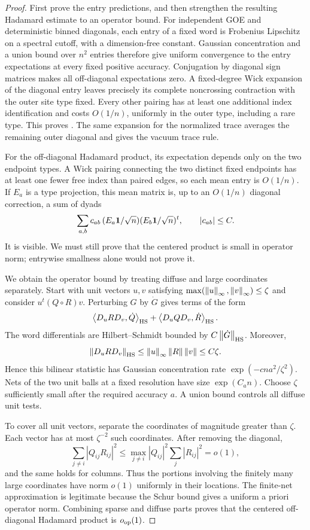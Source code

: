 \begin{proof}
First prove the entry predictions, and then strengthen the resulting
Hadamard estimate to an operator bound.  For independent GOE and
deterministic binned diagonals, each entry of a fixed word is
Frobenius Lipschitz on a spectral cutoff, with a dimension-free
constant.  Gaussian concentration and a union bound over $n^2$
entries therefore give uniform convergence to the entry expectations
at every fixed positive accuracy.
Conjugation by diagonal sign matrices makes all off-diagonal
expectations zero.  A fixed-degree Wick expansion of the diagonal
entry leaves precisely its complete noncrossing contraction with
the outer site type fixed.  Every other pairing has at least one
additional index identification and costs $O(1/n)$, uniformly in the
outer type, including a rare type.  This proves
.  The same expansion for the normalized
trace averages the remaining outer diagonal and gives the vacuum
trace rule.

For the off-diagonal Hadamard product, its expectation depends only on
the two endpoint types.  A Wick pairing connecting the two distinct
fixed endpoints has at least one fewer free index than paired edges,
so each mean entry is $O(1/n)$.  If $E_a$ is a type projection, this
mean matrix is, up to an $O(1/n)$ diagonal correction, a sum of dyads
\[
 \sum_{a,b}c_{ab}\,(E_a\mathbf 1/\sqrt n)(E_b\mathbf 1/\sqrt n)^t,
 \qquad |c_{ab}|\le C.
\]
It is visible.  We must still prove that the centered product is
small in operator norm; entrywise smallness alone would not prove it.

We obtain the operator bound by treating diffuse and large
coordinates separately.  Start with unit vectors $u,v$ satisfying
$\max(\left\lVert u\right\rVert_\infty,\left\lVert v\right\rVert_\infty)\le\zeta$ and consider
$u^t(Q\circ R)v$.  Perturbing $G$ by $\dot G$ gives terms of
the form
\[
 \left\langle D_uR D_v,\dot Q\right\rangle_{\mathrm{HS}}
       +\left\langle D_uQ D_v,\dot R\right\rangle_{\mathrm{HS}}.
\]
The word differentials are Hilbert--Schmidt bounded by
$C\left\lVert \dot G\right\rVert_{\mathrm{HS}}$.  Moreover,
\[
 \left\lVert D_uR D_v\right\rVert_{\mathrm{HS}}
 \le\left\lVert u\right\rVert_\infty\left\lVert R\right\rVert\left\lVert v\right\rVert\le C\zeta.
\]
Hence this bilinear statistic has Gaussian concentration rate
$\exp(-cn a^2/\zeta^2)$.
Nets of the two unit balls at a fixed resolution have size
$\exp(C_an)$.  Choose $\zeta$ sufficiently small after the required
accuracy $a$.  A union bound controls all diffuse unit tests.

To cover all unit vectors, separate the coordinates of magnitude
greater than $\zeta$.  Each vector has at most $\zeta^{-2}$ such
coordinates.  After removing the diagonal,
\[
 \sum_{j\ne i}|Q_{ij}R_{ij}|^2
 \le\max_{j\ne i}|Q_{ij}|^2\sum_j|R_{ij}|^2=o(1),
\]
and the same holds for columns.  Thus the portions involving the
finitely many large coordinates have norm $o(1)$ uniformly in their
locations.  The finite-net approximation is legitimate because the
Schur bound gives a uniform a priori operator norm.  Combining sparse
and diffuse parts proves that the centered off-diagonal Hadamard
product is $o_{\mathrm{op}}(1)$.


\end{proof}
